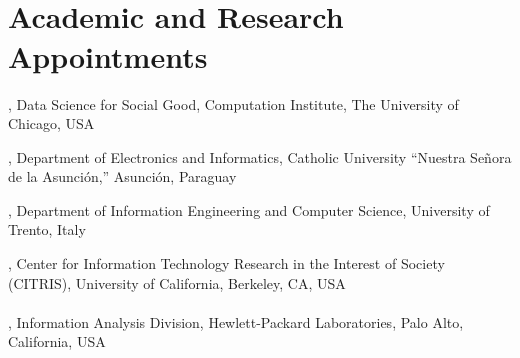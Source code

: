 
\section{\\Academic and Research Appointments}

, Data Science for Social Good, Computation Institute, The University of Chicago, USA 

, Department of Electronics and Informatics, Catholic University ``Nuestra Señora de la Asunción,'' Asunción, Paraguay 

, Department of Information Engineering and Computer Science, University of Trento, Italy 

, Center for Information Technology Research in the Interest of Society (CITRIS), University of California, Berkeley, CA, USA \\\\
, Information Analysis Division, Hewlett-Packard Laboratories, Palo Alto, California, USA 
